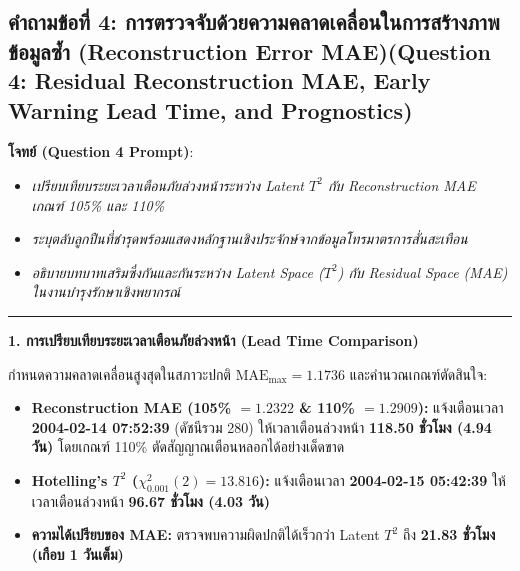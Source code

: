 \documentclass[12pt,a4paper]{article}
\begin{document}
\clearpage
\subsection*{คำถามข้อที่ 4: การตรวจจับด้วยความคลาดเคลื่อนในการสร้างภาพข้อมูลซ้ำ (Reconstruction Error MAE)\newline \normalsize(Question 4: Residual Reconstruction MAE, Early Warning Lead Time, and Prognostics)}
\vspace{-0.5em}

\begin{ansbox}[unbreakable, fontupper={\fontsize{9.3pt}{12.0pt}\selectfont}, left=6pt, right=6pt, top=3pt, bottom=3pt]
\textbf{โจทย์ (Question 4 Prompt)}:
\begin{itemize}[leftmargin=1.2em, itemsep=0pt, topsep=0pt, parsep=0pt]
    \item[(a)] \textit{เปรียบเทียบระยะเวลาเตือนภัยล่วงหน้าระหว่าง Latent $T^2$ กับ Reconstruction MAE เกณฑ์ 105\% และ 110\%}
    \item[(b)] \textit{ระบุตลับลูกปืนที่ชำรุดพร้อมแสดงหลักฐานเชิงประจักษ์จากข้อมูลโทรมาตรการสั่นสะเทือน}
    \item[(c)] \textit{อธิบายบทบาทเสริมซึ่งกันและกันระหว่าง Latent Space ($T^2$) กับ Residual Space (MAE) ในงานบำรุงรักษาเชิงพยากรณ์}
\end{itemize}

\vspace{-0.2em}
\noindent\rule{\linewidth}{0.4pt}
\vspace{-0.2em}

\noindent\textbf{\normalsize 1. การเปรียบเทียบระยะเวลาเตือนภัยล่วงหน้า (Lead Time Comparison)}\par\vspace{0.05em}
กำหนดความคลาดเคลื่อนสูงสุดในสภาวะปกติ $\text{MAE}_{\max} = 1.1736$ และคำนวณเกณฑ์ตัดสินใจ:
\begin{itemize}[leftmargin=1.2em, itemsep=0.5pt, topsep=0.5pt]
    \item \textbf{Reconstruction MAE (105\% $= 1.2322$ \& 110\% $= 1.2909$):} แจ้งเตือนเวลา \textbf{2004-02-14 07:52:39} (ดัชนีรวม 280) ให้เวลาเตือนล่วงหน้า \textbf{118.50 ชั่วโมง (4.94 วัน)} โดยเกณฑ์ 110\% ตัดสัญญาณเตือนหลอกได้อย่างเด็ดขาด
    \item \textbf{Hotelling's $T^2$ ($\chi^2_{0.001}(2) = 13.816$):} แจ้งเตือนเวลา \textbf{2004-02-15 05:42:39} ให้เวลาเตือนล่วงหน้า \textbf{96.67 ชั่วโมง (4.03 วัน)}
    \item \textbf{ความได้เปรียบของ MAE:} ตรวจพบความผิดปกติได้เร็วกว่า Latent $T^2$ ถึง \textbf{21.83 ชั่วโมง (เกือบ 1 วันเต็ม)}
\end{itemize}


\end{ansbox}
\end{document}
